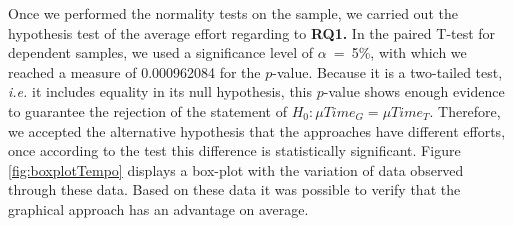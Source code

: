 \documentclass[a4paper,twoside,anonymous]{article}
\begin{document}
Once we performed the normality tests on the sample, we carried out the hypothesis test of the average effort regarding to \textbf{RQ1.}
In the paired T-test for dependent samples, we used a significance level of $\alpha$~=~5\%, with which we reached a measure of 0.000962084 for the $p$-value.
Because it is a two-tailed test, \textit{i.e.} it includes equality in its null hypothesis, this $p$-value shows enough evidence to guarantee the rejection of the statement of $H_0: \mu Time_G = \mu Time_T$.
Therefore, we accepted the alternative hypothesis that the approaches have different efforts, once according to the test this difference is statistically significant.
Figure \ref{fig:boxplotTempo} displays a box-plot with the variation of data observed through these data.
Based on these data it was possible to verify that the graphical approach has an advantage on average.

\end{document}
